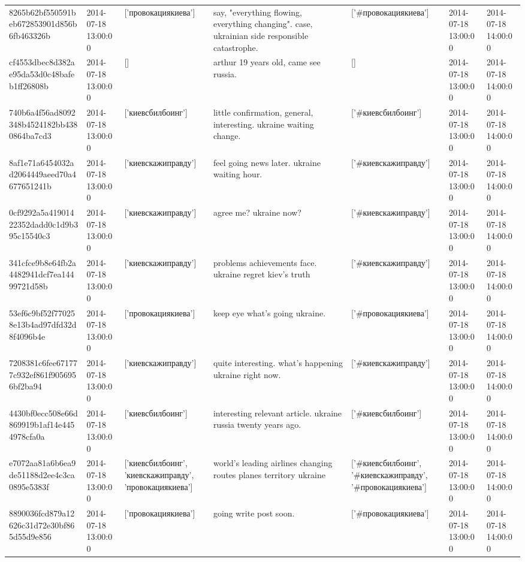 \begin{tabular}{lllllll}
8265b62bf550591beb672853901d856b6fb463326b & 2014-07-18 13:00:00 & ['провокациякиева'] & say, "everything flowing, everything changing". case, ukrainian side responsible catastrophe. & ['#провокациякиева'] & 2014-07-18 13:00:00 & 2014-07-18 14:00:00 \\
cf4553dbec8d382ae95da53d0c48bafeb1ff26808b & 2014-07-18 13:00:00 & [] & arthur 19 years old, came see russia. & [] & 2014-07-18 13:00:00 & 2014-07-18 14:00:00 \\
740b6a4f56ad8092348b4524182bb4380864ba7cd3 & 2014-07-18 13:00:00 & ['киевсбилбоинг'] & little confirmation, general, interesting. ukraine waiting change. & ['#киевсбилбоинг'] & 2014-07-18 13:00:00 & 2014-07-18 14:00:00 \\
8af1e71a6454032ad2064449aeed70a4677651241b & 2014-07-18 13:00:00 & ['киевскажиправду'] & feel going news later. ukraine waiting hour. & ['#киевскажиправду'] & 2014-07-18 13:00:00 & 2014-07-18 14:00:00 \\
0cf9292a5a41901422352dadd0c1d9b395c15540c3 & 2014-07-18 13:00:00 & ['киевскажиправду'] & agree me? ukraine now? & ['#киевскажиправду'] & 2014-07-18 13:00:00 & 2014-07-18 14:00:00 \\
341cfce9b8e64fb2a4482941dcf7ea14499721d58b & 2014-07-18 13:00:00 & ['киевскажиправду'] & problems achievements face. ukraine regret kiev's truth & ['#киевскажиправду'] & 2014-07-18 13:00:00 & 2014-07-18 14:00:00 \\
53ef6c9bf52f770258e13b4ad97dfd32d8f4096b4e & 2014-07-18 13:00:00 & ['провокациякиева'] & keep eye what's going ukraine. & ['#провокациякиева'] & 2014-07-18 13:00:00 & 2014-07-18 14:00:00 \\
7208381c6fee671777c932ef861f9056956bf2ba94 & 2014-07-18 13:00:00 & ['киевскажиправду'] & quite interesting. what's happening ukraine right now. & ['#киевскажиправду'] & 2014-07-18 13:00:00 & 2014-07-18 14:00:00 \\
4430bf0ecc508e66d869919b1af14e4454978cfa0a & 2014-07-18 13:00:00 & ['киевсбилбоинг'] & interesting relevant article. ukraine russia twenty years ago. & ['#киевсбилбоинг'] & 2014-07-18 13:00:00 & 2014-07-18 14:00:00 \\
e7072aa81a6b6ea9de51188d2ee4c3ca0895e5383f & 2014-07-18 13:00:00 & ['киевсбилбоинг', 'киевскажиправду', 'провокациякиева'] & world's leading airlines changing routes planes territory ukraine & ['#киевсбилбоинг', '#киевскажиправду', '#провокациякиева'] & 2014-07-18 13:00:00 & 2014-07-18 14:00:00 \\
8890036fcd879a12626c31d72e30bf865d55d9e856 & 2014-07-18 13:00:00 & ['провокациякиева'] & going write post soon. & ['#провокациякиева'] & 2014-07-18 13:00:00 & 2014-07-18 14:00:00 \\

\end{tabular}

